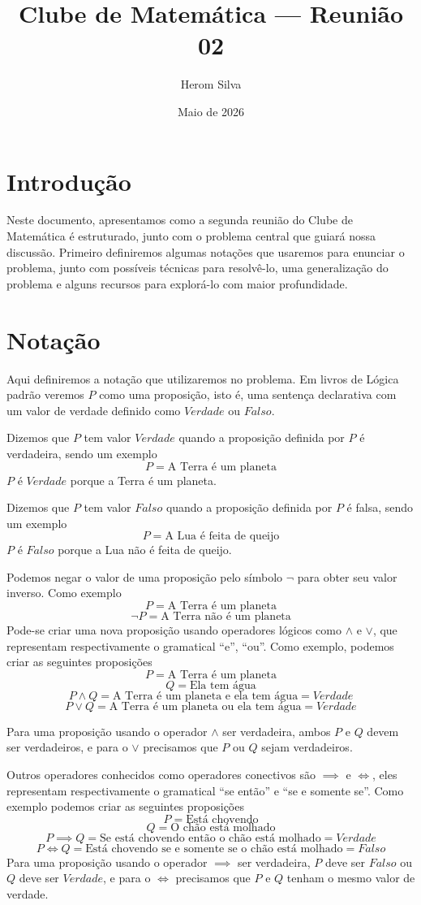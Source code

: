 \documentclass{article}
\title{Clube de Matemática --- Reunião 02}
\author{Herom Silva}
\date{Maio de 2026}
\begin{document}
\maketitle

\section{Introdução}

Neste documento, apresentamos como a segunda reunião do Clube de Matemática 
é estruturado, junto com o problema central que guiará nossa discussão.
Primeiro definiremos algumas notações que usaremos para enunciar o problema, 
junto com possíveis técnicas para resolvê-lo, uma generalização do problema 
e alguns recursos para explorá-lo com maior profundidade.
\newpage
\section{Notação}

Aqui definiremos a notação que utilizaremos no problema. Em livros de Lógica 
padrão veremos $P$ como uma proposição, isto é, uma sentença declarativa com 
um valor de verdade definido como $Verdade$ ou $Falso$.

Dizemos que $P$ tem valor $Verdade$ quando a proposição definida por $P$ 
é verdadeira, sendo um exemplo
$$ P = \text{A Terra é um planeta} $$
$P$ é $Verdade$ porque a Terra é um planeta.

Dizemos que $P$ tem valor $Falso$ quando a proposição definida por $P$ 
é falsa, sendo um exemplo
$$ P = \text{A Lua é feita de queijo}$$
$P$ é $Falso$ porque a Lua não é feita de queijo.

Podemos negar o valor de uma proposição pelo símbolo $\neg$ para obter 
seu valor inverso. Como exemplo
$$ P = \text{A Terra é um planeta}$$
$$ \neg P = \text{A Terra não é um planeta}$$
Pode-se criar uma nova proposição usando operadores lógicos como $\land$ 
e $\lor$, que representam respectivamente o gramatical ``e'', ``ou''. 
Como exemplo, podemos criar as seguintes proposições
$$P = \text{A Terra é um planeta}$$
$$Q = \text{Ela tem água}$$
$$ P \land Q = \text{A Terra é um planeta e ela tem água} = Verdade$$
$$P \lor Q = \text{A Terra é um planeta ou ela tem água} = Verdade$$

Para uma proposição usando o operador $\land$ ser verdadeira, ambos $P$ 
e $Q$ devem ser verdadeiros, e para o $\lor$ precisamos que $P$ ou $Q$ 
sejam verdadeiros.

Outros operadores conhecidos como operadores conectivos são $\implies$ e 
$\iff$, eles representam respectivamente o gramatical ``se então'' e 
``se e somente se''. Como exemplo podemos criar as seguintes proposições
$$P = \text{Está chovendo}$$
$$Q = \text{O chão está molhado}$$
$$ P \implies Q = \text{Se está chovendo então o chão está molhado} = Verdade$$
$$P \iff Q = \text{Está chovendo se e somente se o chão está molhado} = Falso$$
Para uma proposição usando o operador $\implies$ ser verdadeira, $P$ deve 
ser $Falso$ ou $Q$ deve ser $Verdade$, e para o $\iff$ precisamos que 
$P$ e $Q$ tenham o mesmo valor de verdade.
\newpage
\end{document}
